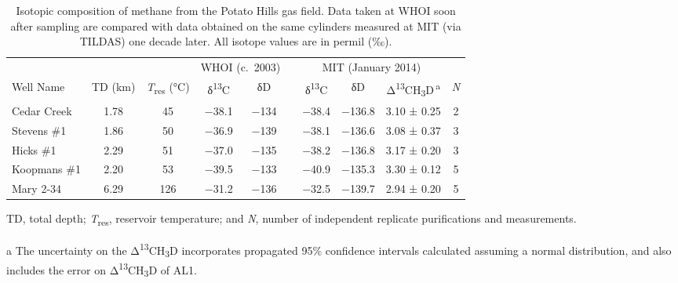 
\begin{table}
	\caption[Isotopic composition of methane from the Potato Hills
	gas field]{Isotopic composition of methane from the Potato Hills
		gas field. Data taken at WHOI soon after sampling \parencite{Seewald+Whelan_2005_AAPG-Origin-of-Petroleum} are compared with data obtained on the same cylinders measured at
		MIT (via TILDAS) one decade later.  All isotope values are in permil (‰).}
	\label{tab:A:1}
	\centering
	\begin{threeparttable}
		\begin{tabular}{l c c cc l ccc c}
			\toprule
			& & & \multicolumn{2}{c}{WHOI (c.\ 2003)} & & \multicolumn{3}{c}{MIT (January 2014)}\tabularnewline
			\cmidrule{4-5} \cmidrule{7-9}
			Well Name & TD (km) & \emph{T}\textsubscript{res} (°C) &
			δ\textsuperscript{13}C & δD & & δ\textsuperscript{13}C & δD &
			Δ\textsuperscript{13}CH\textsubscript{3}D\,\textsuperscript{a} &
			\emph{N}\tabularnewline
			\midrule
			Cedar Creek & 1.78 & 45 & $-$38.1 & $-$134 & & $-$38.4 & $-$136.8 & 3.10 ± 0.25 &
			2\tabularnewline
			Stevens \#1 & 1.86 & 50 & $-$36.9 & $-$139 & & $-$38.1 & $-$136.6 & 3.08 ± 0.37 &
			3\tabularnewline
			Hicks \#1 & 2.29 & 51 & $-$37.0 & $-$135 & & $-$38.2 & $-$136.8 & 3.17 ± 0.20 &
			3\tabularnewline
			Koopmans \#1 & 2.20 & 53 & $-$39.5 & $-$133 & & $-$40.9 & $-$135.3 & 3.30 ± 0.12 &
			5\tabularnewline
			Mary 2-34 & 6.29 & 126 & $-$31.2 & $-$136 & & $-$32.5 & $-$139.7 & 2.94 ± 0.20 &
			5\tabularnewline
			\bottomrule
		\end{tabular}
		{\small TD, total depth; \emph{T}\textsubscript{res}, reservoir temperature; and
		\emph{N}, number of independent replicate purifications and
		measurements.}
		\begin{tablenotes}
			\item[a] The uncertainty on the
			Δ\textsuperscript{13}CH\textsubscript{3}D incorporates propagated 95\%
			confidence intervals calculated assuming a normal distribution, and also
			includes the error on Δ\textsuperscript{13}CH\textsubscript{3}D of AL1.
		\end{tablenotes}
	\end{threeparttable}
\end{table}
